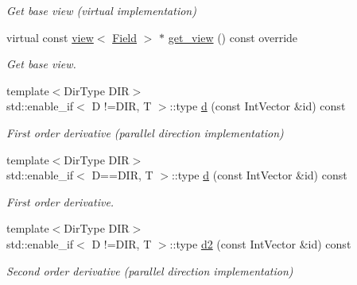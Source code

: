 \begin{DoxyCompactItemize}
\begin{DoxyCompactList}\small\item\em Get base view (virtual implementation) \end{DoxyCompactList}\item 
virtual const \hyperlink{classUintah_1_1PhaseField_1_1detail_1_1view}{view}$<$ \hyperlink{structUintah_1_1PhaseField_1_1ScalarField}{Field} $>$ $\ast$ \hyperlink{classUintah_1_1PhaseField_1_1detail_1_1bc__fd_3_01ScalarField_3_01T_01_4_00_01STN_00_01VAR_00_01f836207db876ecd28bf65f631f79030f_a03ab09ea8008b24b6cbffe0ce8e14388}{get\+\_\+view} () const override
\begin{DoxyCompactList}\small\item\em Get base view. \end{DoxyCompactList}\item 
{\footnotesize template$<$Dir\+Type D\+IR$>$ }\\std\+::enable\+\_\+if$<$ D !=D\+IR, T $>$\+::type \hyperlink{classUintah_1_1PhaseField_1_1detail_1_1bc__fd_3_01ScalarField_3_01T_01_4_00_01STN_00_01VAR_00_01f836207db876ecd28bf65f631f79030f_a1452f655eb6f33907b44f48db57b6a1c}{d} (const Int\+Vector \&id) const
\begin{DoxyCompactList}\small\item\em First order derivative (parallel direction implementation) \end{DoxyCompactList}\item 
{\footnotesize template$<$Dir\+Type D\+IR$>$ }\\std\+::enable\+\_\+if$<$ D==D\+IR, T $>$\+::type \hyperlink{classUintah_1_1PhaseField_1_1detail_1_1bc__fd_3_01ScalarField_3_01T_01_4_00_01STN_00_01VAR_00_01f836207db876ecd28bf65f631f79030f_affc4340b3354ce21d34ca76f6664a9d0}{d} (const Int\+Vector \&id) const
\begin{DoxyCompactList}\small\item\em First order derivative. \end{DoxyCompactList}\item 
{\footnotesize template$<$Dir\+Type D\+IR$>$ }\\std\+::enable\+\_\+if$<$ D !=D\+IR, T $>$\+::type \hyperlink{classUintah_1_1PhaseField_1_1detail_1_1bc__fd_3_01ScalarField_3_01T_01_4_00_01STN_00_01VAR_00_01f836207db876ecd28bf65f631f79030f_a8e015275a6e592cd7f6a93634eea51fb}{d2} (const Int\+Vector \&id) const
\begin{DoxyCompactList}\small\item\em Second order derivative (parallel direction implementation) \end{DoxyCompactList}\item 

\end{DoxyCompactItemize}
